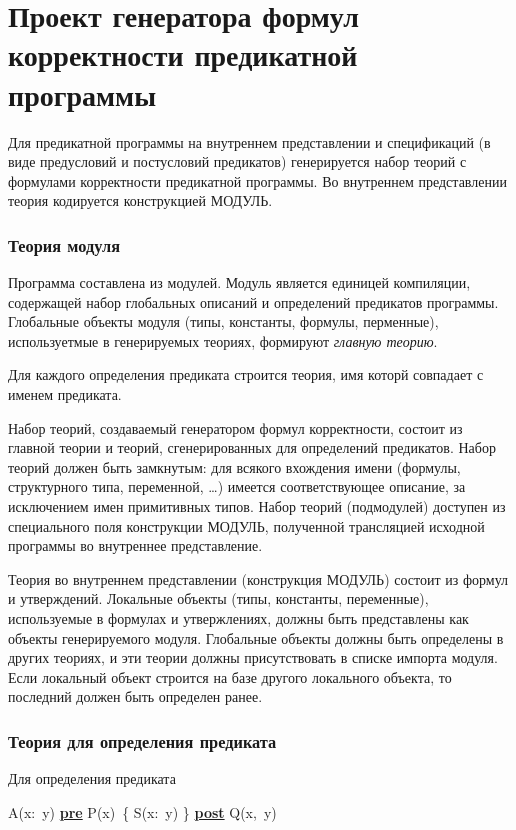 \documentclass[10pt,a4paper]{article}
\begin{document}
\part*{Проект генератора формул корректности предикатной программы}

Для предикатной программы на внутреннем представлении и спецификаций (в виде предусловий и постусловий предикатов) генерируется набор теорий с формулами корректности предикатной программы. Во внутреннем представлении теория кодируется конструкцией МОДУЛЬ.

\section{Теория модуля}
Программа составлена из модулей. Модуль является единицей компиляции, содержащей набор глобальных описаний и определений предикатов программы. Глобальные объекты модуля (типы, константы, формулы, перменные), используетмые в генерируемых теориях, формируют \textit{главную теорию}.

Для каждого определения предиката строится теория, имя которй совпадает с именем предиката.

Набор теорий, создаваемый генератором формул корректности, состоит из главной теории и теорий, сгенерированных для определений предикатов. Набор теорий должен быть замкнутым: для всякого вхождения имени (формулы, структурного типа, переменной, …) имеется соответствующее описание, за исключением имен примитивных типов. Набор теорий (подмодулей) доступен из специального поля конструкции МОДУЛЬ, полученной трансляцией исходной программы во внутреннее представление.

Теория во внутреннем представлении (конструкция МОДУЛЬ) состоит из формул и утверждений. Локальные объекты (типы, константы, переменные), используемые в формулах и утвержлениях, должны быть представлены как объекты генерируемого модуля. Глобальные объекты должны быть определены в других теориях, и эти теории должны присутствовать в списке импорта модуля. Если локальный объект строится на базе другого локального объекта, то последний должен быть определен ранее.

\section{Теория для определения предиката}

Для определения предиката

\begin{center}
A(x: y) \underline{\textbf{pre}} P(x) \{ S(x: y) \} \underline{\textbf{post}} Q(x, y)
\end{center}
\end{document}

